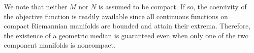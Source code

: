 \documentclass[10pt]{article}
\newcommand{\bbN}{\mathbb{N}}
\newcommand{\bbRpos}{\mathbb{R}_{+}}
\newcommand{\calM}{\mathcal{M}}
\begin{document}


We note that neither $M$ nor $N$ is assumed to be compact. If so, the coercivity of the objective function is readily available since all continuous functions on compact Riemannian manifolds are bounded and attain their extrema. Therefore, the existence of a geometric median is guaranteed even when only one of the two component manifolds is noncompact.
\end{document}
